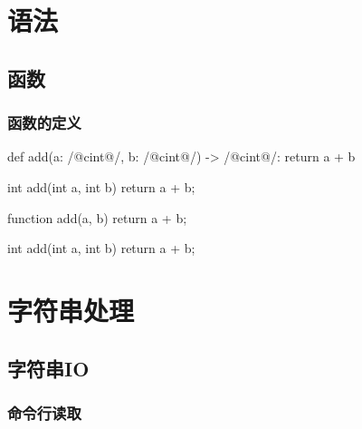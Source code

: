 \documentclass[hidelinks]{ctexart}
\begin{document}

\section{语法} %
\label{sec:语法}

\subsection{函数} %
\label{sub:函数}

\subsubsection{函数的定义} %
\label{ssub:函数的定义}

\begin{pylst}
def add(a: /@\+c{int}@/, b: /@\+c{int}@/) -> /@\+c{int}@/:
    return a + b
\end{pylst}
\begin{javalst}
int add(int a, int b) {
    return a + b;
}
\end{javalst}
\begin{jslst}
function add(a, b) {
    return a + b;
}
\end{jslst}
\begin{cshlst}
int add(int a, int b) {
    return a + b;
}
\end{cshlst}




\section{字符串处理} %
\label{sec:字符串处理}

\subsection{字符串IO} %
\label{sub:字符串io}

\subsubsection{命令行读取} %
\label{ssub:命令行读取}
\end{document}
